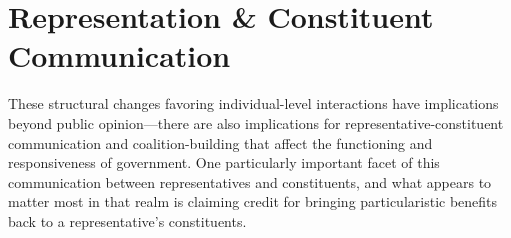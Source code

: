\documentclass[12pt]{article}
\begin{document}


\section*{Representation \& Constituent Communication}
These structural changes favoring individual-level interactions have implications beyond public opinion---there are also implications for representative-constituent communication and coalition-building that affect the functioning and responsiveness of government.  One particularly important facet of this communication between representatives and constituents, and what appears to matter most in that realm is claiming credit for bringing particularistic benefits back to a representative's constituents. 
\end{document}
